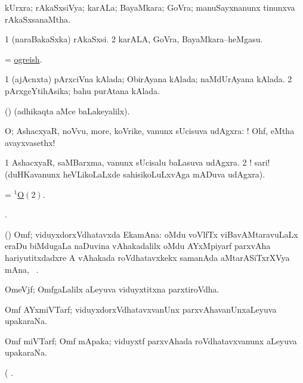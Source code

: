 \bentry
{}
\gl{\gu}
\bmng
kUrxra; rAkaSxsiVya; karALa; BayaMkara; GoVra; manuSayxnanunx tinunxva rAkaSxsanaMtha. 
\emng
\eentry

\bentry
{}
\gl{\nA}
\bmng
\bnum
\num{1} (naraBakaSxka) rAkaSxsi. 
\num{2} karALA, GoVra, BayaMkara--heMgasu. 
\enum
\emng
\eentry


\bentry
{}
\gl{\gu}
\bmng
= \hyperlink{ogreish}{ogreish}. 
\emng
\eentry

\bentry
{}
\gl{\gu}
\bmng
\bnum
\num{1} (ajAcnxta) pArxciVna kAlada; ObirAyana kAlada; naMdUrAyana kAlada. 
\num{2} pArxgeYtihAsika; bahu purAtana kAlada. 
\enum
\emng
\eentry

\bentry
{}
\gl{\saMkiSx}
\bmng
(\ame)  (adhikaqta aMce baLakeyalilx). 
\emng
\eentry

\bentry
{}
\gl{\BAavayx}
\bmng
O; AshacxyaR, noVvu, more, koVrike, \mo vanunx sUcisuva udAgxra: ! Ohf, eMtha avayxvasethx! 
\emng

\noindent
\gl{\pagu}
\bmng
\bnum
\num{1}  AshacxyaR, saMBarxma, \mo vanunx sUcisalu baLasuva udAgxra. 
\num{2} ! sari! (duHKavanunx heVLikoLaLxde sahisikoLuLxvAga mADuva udAgxra). 
\enum
\emng
\eentry

\bentry
{}
\gl{\nA}
\bmng
= \hyperlink{O(1)2}{$^1$O\((2)\)}. 
\emng
\eentry

\bentry
{}
\gl{\saMkiSx}
\bmng
{}. 
\emng
\eentry

\bentry
{}
\gl{\nA}
\bmng
(\viduyx) Omf; viduyxdorxVdhatavxda EkamAna: oMdu voVlfTx viBavAMtaravuLaLx eraDu biMdugaLa naDuvina vAhakadalilx oMdu AYxMpiyarf parxvAha hariyutitxdadxre A vAhakada roVdhatavxkekx samanAda aMtarASiTxrXVya mAna, \saMkeV\ \eng{$\Omega$}. 
\emng
\eentry

\bentry
{}
\gl{\nA}
\bmng
OmeVjf; OmfgaLalilx aLeyuva viduyxtitxna parxtiroVdha. 
\emng
\eentry

\bentry
{}
\gl{\nA}
\bmng
Omf AYxmiVTarf; viduyxdorxVdhatavxvanUnx parxvAhavanUnxaLeyuva upakaraNa. 
\emng
\eentry

\bentry
{}
\gl{\nA}
\bmng
Omf miVTarf; Omf mApaka; viduyxtf parxvAhada roVdhatavxvanunx aLeyuva upakaraNa. 
\emng
\eentry

\bentry
{}
\gl{\saMkiSx}
\bmng
{} ( . 
\emng
\eentry

